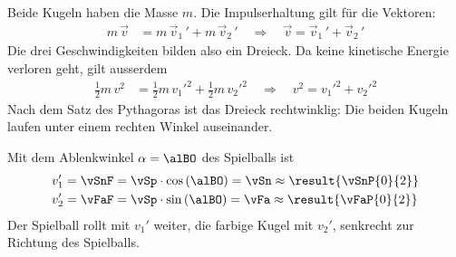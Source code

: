 Beide Kugeln haben die Masse $m$. Die Impulserhaltung gilt für die Vektoren:
\begin{align}
 m\,\vec v &= m\,\vec v_1\,' + m\,\vec v_2\,' \quad\Rightarrow\quad \vec v = \vec v_1\,' + \vec v_2\,'
\end{align}
Die drei Geschwindigkeiten bilden also ein Dreieck. Da keine kinetische Energie verloren geht, gilt ausserdem
\begin{align}
 \frac{1}{2}m\,v^2 &= \frac{1}{2}m\,{v_1'}^2 + \frac{1}{2}m\,{v_2'}^2 \quad\Rightarrow\quad v^2 = {v_1'}^2 + {v_2'}^2
\end{align}
Nach dem Satz des Pythagoras ist das Dreieck rechtwinklig: Die beiden Kugeln laufen unter einem rechten Winkel auseinander.

\begin{center}
\end{center}

Mit dem Ablenkwinkel $\alpha = \alBO$ des Spielballs ist
\begin{align}
 v_1' &= \vSnF = \vSp\cdot\cos\left(\alBO\right) = \vSn \approx \result{\vSnP{0}{2}} \\
 v_2' &= \vFaF = \vSp\cdot\sin\left(\alBO\right) = \vFa \approx \result{\vFaP{0}{2}}
\end{align}
Der Spielball rollt mit $v_1'$ weiter, die farbige Kugel mit $v_2'$, senkrecht zur Richtung des Spielballs.
